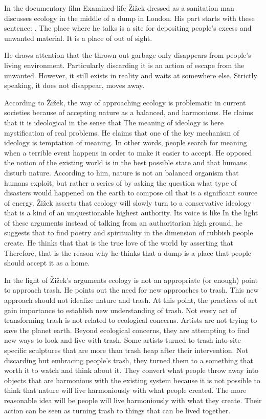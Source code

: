 In the documentary film Examined-life Žižek dressed as a sanitation man discusses ecology in the middle of a dump in London. His part starts with these sentence: . The place where he talks is a site for depositing people’s excess and unwanted material. It is a place of out of sight.

He draws attention that the thrown out garbage only disappears from people’s living environment. Particularly discarding it is an action of escape from the unwanted. However, it still exists in reality and waits at somewhere else. Strictly speaking, it does not disappear, moves away.

According to Žižek, the way of approaching ecology is problematic in current societies because of accepting nature as a balanced, and harmonious. He claims that it is ideological in the sense that  The meaning of ideology is here mystification of real problems. He claims that one of the key mechanism of ideology is temptation of meaning. In other words, people search for meaning when a terrible event happens in order to make it easier to accept. He opposed the notion of the existing world is in the best possible state and that humans disturb nature. According to him, nature is not an balanced organism that humans exploit, but rather a series of  by asking the question what type of disasters would happened on the earth to compose oil that is a significant source of energy. Žižek asserts that ecology will slowly turn to a conservative ideology that is a kind of an unquestionable highest authority. Its voice is like  In the light of these arguments instead of talking from an authoritarian high ground, he suggests that to find poetry and spirituality in the dimension of rubbish people create. He thinks that that is the true love of the world by asserting that  Therefore, that is the reason why he thinks that a dump is a place that people should accept it as a home. 

In the light of Žižek’s arguments ecology is not an appropriate (or enough) point to approach trash. He points out the need for new approaches to trash. This new approach should not idealize nature and trash. At this point, the practices of art gain importance to establish new understanding of trash. Not every act of transforming trash is not related to ecological concerns. Artists are not trying to save the planet earth. Beyond ecological concerns, they are attempting to find new ways to look and live with trash. Some artists turned to trash into site-specific sculptures that are more than trash heap after their intervention. Not discarding but embracing people's trash, they turned them to a something that worth it to watch and think about it. They convert what people throw away into objects that are harmonious with the existing system because it is not possible to think that nature will live harmoniously with what people created. The more reasonable idea will be people will live harmoniously with what they create. Their action can be seen as turning trash to things that can be lived together.

